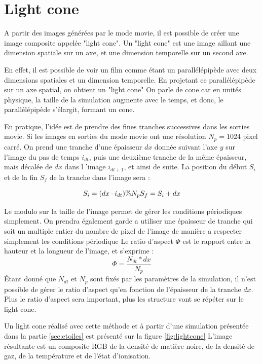 \section{Light cone}

A partir des images générées par le mode movie, il est possible de créer une image composite appelée "light cone".
Un "light cone" est une image aillant une dimension spatiale sur un axe, et une dimension temporelle sur un second axe.

En effet, il est possible de voir un film comme étant un parallélépipède avec deux dimensions spatiales et un dimension temporelle.
En projetant ce parallélépipède sur un axe spatial, on obtient un "light cone"
On parle de cone car en unités physique, la taille de la simulation augmente avec le temps, et donc, le parallélépipède s'élargit, formant un cone.

En pratique, l'idée est de prendre des fines tranches successives dans les sorties movie.
Si les images en sorties du mode movie ont une résolution $N_p=1024$ pixel carré.
On prend une tranche d'une épaisseur $dx$ donnée suivant l'axe $y$ sur l'image du pas de temps $i_{dt}$, puis une deuxième tranche de la même épaisseur, mais décalée de $dx$ dans l 'image $i_{dt+1}$, et ainsi de suite.
La position du début $S_i$ et de la fin $S_f$ de la tranche dans l'image sera :

\begin{equation}
S_i = (dx \cdot i_{dt}) \% N_p \\
S_f = S_i + dx 
\end{equation} 

Le modulo sur la taille de l'image permet de gérer les conditions périodiques simplement.
On prendra également garde a utiliser une épaisseur de tranche qui soit un multiple entier du nombre de pixel de l'image de manière a respecter simplement les conditions périodique
Le ratio d'aspect $\Phi$ est le rapport entre la hauteur et la longueur de l'image, et s'exprime :
\begin{equation}
\Phi = \frac{ N_{dt} * dx}{N_p}
\end{equation}
Étant donné que $N_{dt}$ et $N_p$ sont fixés par les paramètres de la simulation, il n'est possible de gérer le ratio d'aspect qu'en fonction de l'épaisseur de la tranche $dx$.
Plus le ratio d'aspect sera important, plus les structure vont se répéter sur le light cone.

Un light cone réalisé avec cette méthode et à partir d'une simulation présentée dans la partie \ref{sec:etoiles} est présenté sur la figure \ref{fig:lightcone}
L'image résultante est un composite \ac{RGB} de la densité de matière noire, de la densité de gaz, de la température et de l'état d'ionisation.

